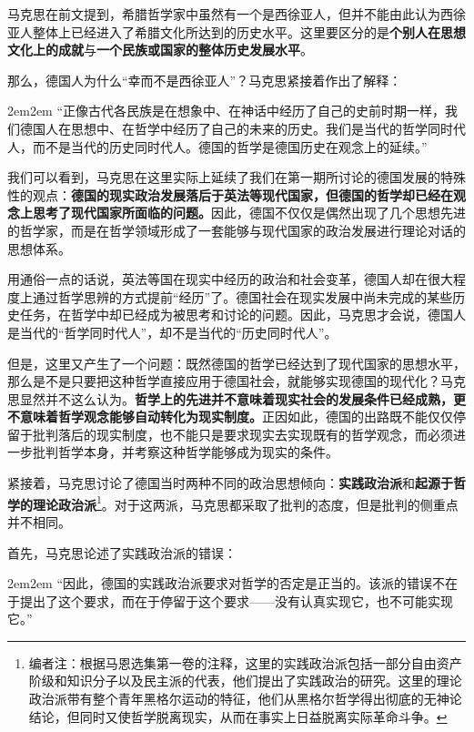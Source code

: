 \documentclass[a4paper,twoside,12pt,AutoFakeBold]{ctexart}
\begin{document}
马克思在前文提到，希腊哲学家中虽然有一个是西徐亚人，但并不能由此认为西徐亚人整体上已经进入了希腊文化所达到的历史水平。这里要区分的是\textbf{个别人在思想文化上的成就}与\textbf{一个民族或国家的整体历史发展水平}。

那么，德国人为什么“幸而不是西徐亚人”？马克思紧接着作出了解释：

\begin{adjustwidth}{2em}{2em}
\qquad\fangsong
“正像古代各民族是在想象中、在神话中经历了自己的史前时期一样，我们德国人在思想中、在哲学中经历了自己的未来的历史。我们是当代的哲学同时代人，而不是当代的历史同时代人。德国的哲学是德国历史在观念上的延续。”
\end{adjustwidth}

我们可以看到，马克思在这里实际上延续了我们在第一期所讨论的德国发展的特殊性的观点：\textbf{德国的现实政治发展落后于英法等现代国家，但德国的哲学却已经在观念上思考了现代国家所面临的问题。}因此，德国不仅仅是偶然出现了几个思想先进的哲学家，而是在哲学领域形成了一套能够与现代国家的政治发展进行理论对话的思想体系。

用通俗一点的话说，英法等国在现实中经历的政治和社会变革，德国人却在很大程度上通过哲学思辨的方式提前“经历”了。德国社会在现实发展中尚未完成的某些历史任务，在哲学中却已经成为被思考和讨论的问题。因此，马克思才会说，德国人是当代的“哲学同时代人”，却不是当代的“历史同时代人”。

但是，这里又产生了一个问题：既然德国的哲学已经达到了现代国家的思想水平，那么是不是只要把这种哲学直接应用于德国社会，就能够实现德国的现代化？马克思显然并不这么认为。\textbf{哲学上的先进并不意味着现实社会的发展条件已经成熟，更不意味着哲学观念能够自动转化为现实制度。}正因如此，德国的出路既不能仅仅停留于批判落后的现实制度，也不能只是要求现实去实现既有的哲学观念，而必须进一步批判哲学本身，并考察这种哲学能够成为现实的条件。

紧接着，马克思讨论了德国当时两种不同的政治思想倾向：\textbf{实践政治派}和\textbf{起源于哲学的理论政治派}\footnote{编者注：根据马恩选集第一卷的注释，这里的实践政治派包括一部分自由资产阶级和知识分子以及民主派的代表，他们提出了实践政治的研究。这里的理论政治派带有整个青年黑格尔运动的特征，他们从黑格尔哲学得出彻底的无神论结论，但同时又使哲学脱离现实，从而在事实上日益脱离实际革命斗争。}。对于这两派，马克思都采取了批判的态度，但是批判的侧重点并不相同。

首先，马克思论述了实践政治派的错误：

\begin{adjustwidth}{2em}{2em}
\qquad\fangsong
“因此，德国的实践政治派要求对哲学的否定是正当的。该派的错误不在于提出了这个要求，而在于停留于这个要求——没有认真实现它，也不可能实现它。”
\end{adjustwidth}
\end{document}
